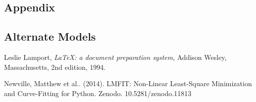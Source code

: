 \documentclass[11pt]{article}
\begin{document}
\begin{multicols}{2}
\section{Appendix}

\subsection{Alternate Models}


 






\begin{thebibliography}{9}

  Leslie Lamport,
  \textit{\LaTeX: a document preparation system},
  Addison Wesley, Massachusetts,
  2nd edition,
  1994.

Newville, Matthew et al.. (2014). LMFIT: Non-Linear Least-Square Minimization and Curve-Fitting for Python. Zenodo. 10.5281/zenodo.11813



\end{thebibliography}







\end{multicols}
\end{document}
